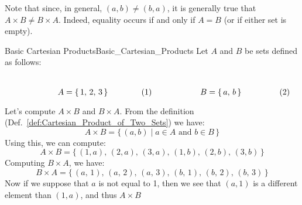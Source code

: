         Note that since, in general, $(a,b)\ne(b,a)$, it is generally true that
        $A\times{B}\ne{B}\times{A}$. Indeed, equality occurs if and only if
        $A=B$ (or if either set is empty).
        \begin{fexample}{Basic Cartesian Products}{Basic_Cartesian_Products}
            Let $A$ and $B$ be sets defined as follows:
            \par
            \begin{subequations}
                \begin{minipage}[b]{0.49\textwidth}
                    \centering
                    \begin{equation}
                        A=\{\,1,\,2,\,3\,\}
                    \end{equation}
                \end{minipage}
                \hfill
                \begin{minipage}[b]{0.49\textwidth}
                    \centering
                    \begin{equation}
                        B=\{\,a,\,b\,\}
                    \end{equation}
                \end{minipage}
            \end{subequations}
            \par\vspace{2.5ex}
            Let's compute $A\times{B}$ and $B\times{A}$. From the definition
            (Def.~\ref{def:Cartesian_Product_of_Two_Sets}) we have:
            \begin{equation}
                A\times{B}=\{\,(a,b)\;|\;a\in{A}\textrm{ and }b\in{B}\,\}
            \end{equation}
            Using this, we can compute:
            \begin{equation}
                A\times{B}=\big\{\,(1,a),\,(2,a),\,(3,a),\,
                                   (1,b),\,(2,b),\,(3,b)\,\big\}
            \end{equation}
            Computing $B\times{A}$, we have:
            \begin{equation}
                B\times{A}=\big\{\,(a,\,1),\,(a,\,2),\,(a,\,3),\,
                                   (b,\,1),\,(b,\,2),\,(b,\,3)\,\big\}
            \end{equation}
            Now if we suppose that $a$ is not equal to 1, then we see that
            $(a,1)$ is a different element than $(1,a)$, and thus $A\times{B}$

\end{fexample}
